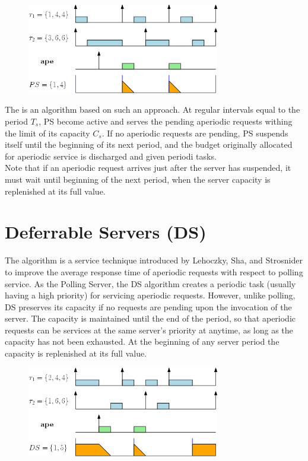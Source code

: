 \begin{figure}[!h]
    \centering
    \includegraphics[width = 0.75\textwidth]{images/image04.png}
\end{figure}


The  is an algorithm based on such an approach. At regular intervals equal to the period $T_s$, PS become active and serves the pending aperiodic requests withing the limit of its capacity $C_s$. If no aperiodic requests are pending, PS suspends itself until the beginning of its next period, and the budget originally allocated for aperiodic service is discharged and given periodi tasks.\\
Note that if an aperiodic request arrives just after the server has suspended, it must wait until beginning of the next period, when the server capacity is replenished at its full value.

\section{Deferrable Servers (DS)}
The  algorithm is a service technique introduced by Lehoczky, Sha, and Strosnider to improve the average response time of aperiodic requests with respect to polling service. As the Polling Server, the DS algorithm creates a periodic task (usually having a high priority) for servicing aperiodic requests. However, unlike polling, DS preserves its capacity if no requests are pending upon the invocation of the server. The capacity is maintained until the end of the period, so that aperiodic requests can be services at the same server's priority at anytime, as long as the capacity has not been exhausted. At the beginning of any server period the capacity is replenished at its full value.


\begin{figure}[!h]
    \centering
    \includegraphics[width = 0.75\textwidth]{images/image05.png}
\end{figure}


